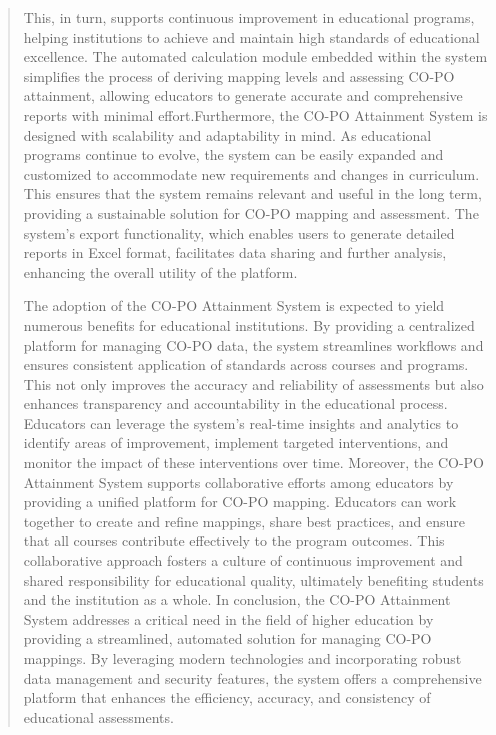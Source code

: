 \documentclass[12pt]{report}
\begin{document}
\begin{quote}
		This, in turn, supports continuous improvement in educational programs, helping institutions to achieve and maintain high standards of educational excellence. The automated calculation module embedded within the system simplifies the process of deriving mapping levels and assessing CO-PO attainment, allowing educators to generate accurate and comprehensive reports with minimal effort.Furthermore, the CO-PO Attainment System is designed with scalability and adaptability in mind. As educational programs continue to evolve, the system can be easily expanded and customized to accommodate new requirements and changes in curriculum. This ensures that the system remains relevant and useful in the long term, providing a sustainable solution for CO-PO mapping and assessment. The system's export functionality, which enables users to generate detailed reports in Excel format, facilitates data sharing and further analysis, enhancing the overall utility of the platform.
		
		The adoption of the CO-PO Attainment System is expected to yield numerous benefits for educational institutions. By providing a centralized platform for managing CO-PO data, the system streamlines workflows and ensures consistent application of standards across courses and programs. This not only improves the accuracy and reliability of assessments but also enhances transparency and accountability in the educational process. Educators can leverage the system's real-time insights and analytics to identify areas of improvement, implement targeted interventions, and monitor the impact of these interventions over time.
		Moreover, the CO-PO Attainment System supports collaborative efforts among educators by providing a unified platform for CO-PO mapping. Educators can work together to create and refine mappings, share best practices, and ensure that all courses contribute effectively to the program outcomes. This collaborative approach fosters a culture of continuous improvement and shared responsibility for educational quality, ultimately benefiting students and the institution as a whole.
		In conclusion, the CO-PO Attainment System addresses a critical need in the field of higher education by providing a streamlined, automated solution for managing CO-PO mappings. By leveraging modern technologies and incorporating robust data management and security features, the system offers a comprehensive platform that enhances the efficiency, accuracy, and consistency of educational assessments. 
	\end{quote}
	\clearpage
	
\end{document}
